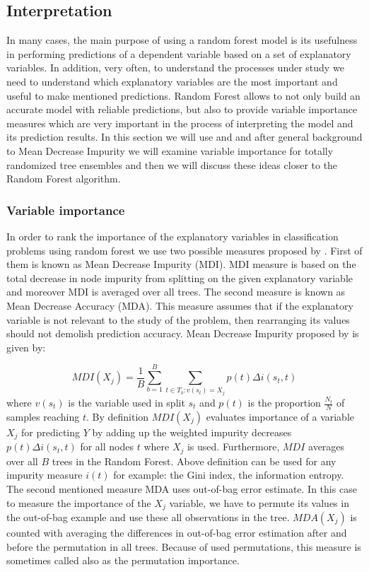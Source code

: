 \subsection{Interpretation}
In many cases, the main purpose of using a random forest model is its usefulness in performing predictions of a dependent variable
based on a set of explanatory variables. In addition, very often, to understand the processes under study we need to understand
which explanatory variables are the most important and useful to make mentioned predictions. 
Random Forest allows to not only build an accurate model with reliable predictions, 
but also to provide variable importance measures which are very important in the process of interpreting the model and 
its prediction results. In this section we will use \cite{louppe2013understanding} 
and \cite{gerard2016foresttour} and after general background to Mean Decrease Impurity we will examine variable importance for totally randomized tree ensembles and then we will discuss these ideas closer to the Random Forest algorithm.

\subsubsection{Variable importance}
In order to rank the importance of the explanatory variables in classification problems using random forest 
we use two possible measures proposed by \cite{breiman2001random}. 
First of them is known as Mean Decrease Impurity (MDI). MDI measure is based on the total decrease in node impurity from splitting 
on the given explanatory variable and moreover MDI is averaged over all trees. 
The second measure is known as Mean Decrease Accuracy (MDA). 
This measure assumes that if the explanatory variable is not relevant to the study of the problem, 
then rearranging its values should not demolish prediction accuracy. Mean Decrease Impurity proposed 
by \cite{breiman2001random} is given by: 

\begin{equation}\label{eq:MDI}
	{MDI}( X_{j} ) = \frac{1}{B} \displaystyle \sum_{b=1}^{B}  \displaystyle\sum_{t \in T_{b}: v(s_{t})=  X_{j}  } p(t)\Delta i(s_{t}, t)
\end{equation}
where $ v(s_{t}) $ is the variable used in split $s_{t}$ and $ p(t) $ is the proportion $\frac{N_{t}}{N}$ of samples reaching $t$.
By definition $ MDI( X_{j} ) $ evaluates importance of a variable $ X_{j} $ for predicting $Y$ by 
adding up the weighted impurity decreases $p(t) \Delta i(s_{t}, t)$ for all nodes $t$ where $ X_{j}$ is used. 
Furthermore, $MDI$ averages over all $B$ trees in the Random Forest. 
Above definition can be used for any impurity measure $i(t)$ for example: the Gini index, the information entropy. 
The second mentioned measure MDA uses out-of-bag error estimate. 
In this case to measure the importance of the $X_{j}$ variable, we have to permute its values in the out-of-bag example and 
use these all observations in the tree. $ MDA( X_{j} )$ is counted with averaging the differences in 
out-of-bag error estimation after and before the permutation in all trees. Because of used permutations, 
this measure is sometimes called also as the permutation importance.

